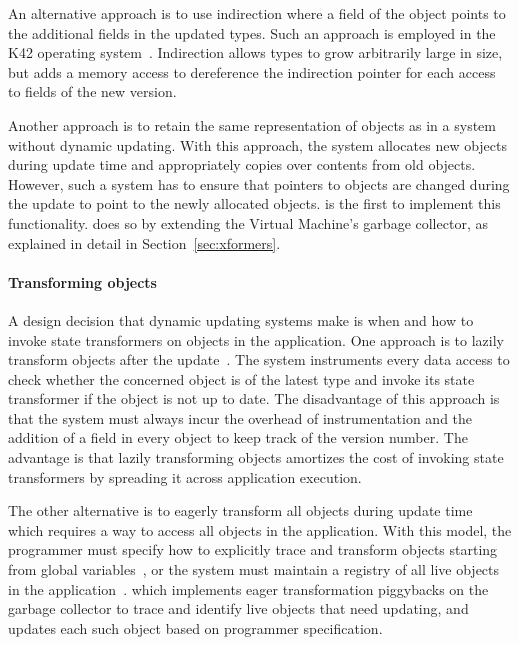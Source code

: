 An alternative approach is to use indirection where a field of the object
points to the additional fields in the updated types. Such an approach is
employed in the K42 operating system~\cite{K42reconfig}. Indirection allows
types to grow arbitrarily large in size, but adds a memory access to
dereference the indirection pointer for each access to fields of the new
version.

Another approach is to retain the same representation of objects as in a
system without dynamic updating. With this approach, the system allocates
new objects during update time and appropriately copies over contents from
old objects. However, such a system has to ensure that pointers to objects
are changed during the update to point to the newly allocated objects.  \JV
is the first to implement this functionality. \JV does so by extending the Virtual Machine's
garbage collector, as explained in detail in Section~\ref{sec:xformers}.

\paragraph{Transforming objects}
A design decision that dynamic updating systems make is when and how to
invoke state transformers on objects in the application. One approach is to
lazily transform objects after the update~\cite{neamtiu06dsu,
boyapati03lazy, ritzau00dynamic}. The system instruments every data access
to check whether the concerned object is of the latest type and invoke its
state transformer if the object is not up to date. The disadvantage of this
approach is that the system must always incur the
overhead of instrumentation and the addition of a field in every object to
keep track of the version number.
The advantage is that
lazily transforming objects
amortizes the cost of invoking state transformers by spreading it across
application execution.

The other alternative is to eagerly transform all objects during update
time which requires a way to access all objects in the application.
With this model,
the programmer must specify how to explicitly trace and
transform objects starting from global variables~\cite{hicks-thesis}, or
the system must maintain
a registry of all live objects in the
application~\cite{K42reconfig}. \JV which implements eager transformation
piggybacks on the garbage collector to trace and identify live objects that
need updating, and updates each such object based on programmer
specification.
